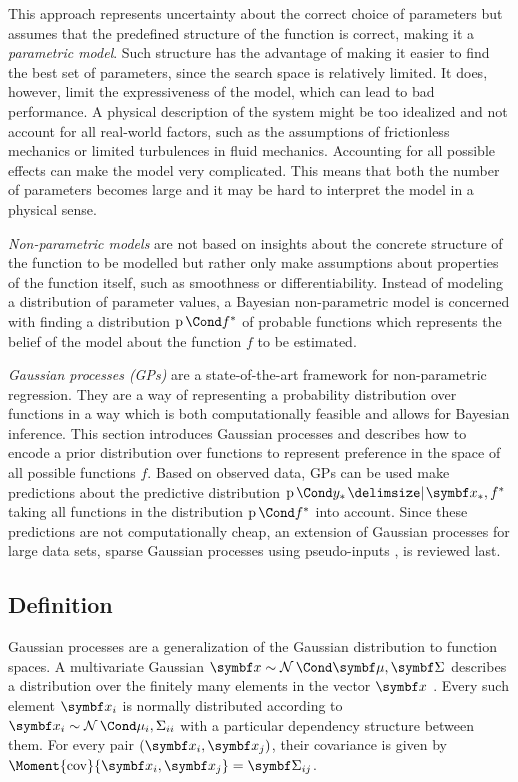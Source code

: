 This approach represents uncertainty about the correct choice of parameters but assumes that the predefined structure of the function is correct, making it a \emph{parametric model}.
Such structure has the advantage of making it easier to find the best set of parameters, since the search space is relatively limited.
It does, however, limit the expressiveness of the model, which can lead to bad performance.
A physical description of the system might be too idealized and not account for all real-world factors, such as the assumptions of frictionless mechanics or limited turbulences in fluid mechanics.
Accounting for all possible effects can make the model very complicated.
This means that both the number of parameters becomes large and it may be hard to interpret the model in a physical sense.

\emph{Non-parametric models} are not based on insights about the concrete structure of the function to be modelled but rather only make assumptions about properties of the function itself, such as smoothness or differentiability.
Instead of modeling a distribution of parameter values, a Bayesian non-parametric model is concerned with finding a distribution $\Prob{f^\ast}$ of probable functions which represents the belief of the model about the function $f$ to be estimated.

\emph{Gaussian processes (GPs)} are a state-of-the-art framework for non-parametric regression.
They are a way of representing a probability distribution over functions in a way which is both computationally feasible and allows for Bayesian inference.
This section introduces Gaussian processes and describes how to encode a prior distribution over functions to represent preference in the space of all possible functions $f$.
Based on observed data, GPs can be used make predictions about the predictive distribution $\Prob{y_\ast \given \mat{x_\ast}, f^\ast}$ taking all functions in the distribution $\Prob{f^\ast}$ into account.
Since these predictions are not computationally cheap, an extension of Gaussian processes for large data sets, sparse Gaussian processes using pseudo-inputs \cite{snelson_sparse_2005}, is reviewed last.

\subsection{Definition}
Gaussian processes are a generalization of the Gaussian distribution to function spaces.
A multivariate Gaussian $\mat{x} \sim \Gaussian{\mat{\mu}, \mat{\Sigma}}$ describes a distribution over the finitely many elements in the vector $\mat{x}$ \cite{gauss_theoria_1809}.
Every such element $\rv{x_i}$ is normally distributed according to $\rv{x_i} \sim \Gaussian{\mu_i, \Sigma_{ii}}$ with a particular dependency structure between them.
For every pair $(\rv{x_i}, \rv{x_j})$, their covariance is given by $\Moment{\cov}{\rv{x_i}, \rv{x_j}} = \mat{\Sigma}_{ij}$.

